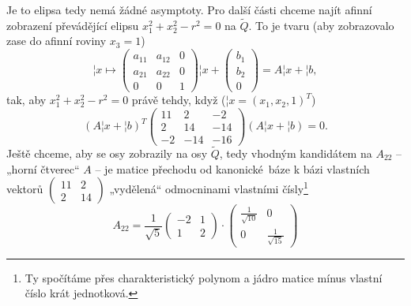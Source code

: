 \documentclass[12pt]{article}                   %
\begin{document}
\begin{priklad}[10.6]
	\begin{reseni}
		Je to elipsa tedy nemá žádné asymptoty. Pro další části chceme najít afinní zobrazení převádějící elipsu $x_1^2 + x_2^2 - r^2 = 0$ na $\tilde Q$. To je tvaru (aby zobrazovalo zase do afinní roviny $x_3 = 1$)
		$$ ¦x \mapsto \begin{pmatrix} a_{11} & a_{12} & 0 \\ a_{21} & a_{22} & 0 \\ 0 & 0 & 1 \end{pmatrix}¦x  + \begin{pmatrix} b_1 \\ b_2 \\ 0 \end{pmatrix} = A¦x + ¦b, $$
		tak, aby $x_1^2 + x_2^2 - r^2 = 0$ právě tehdy, když ($¦x = (x_1, x_2, 1)^T$)
		$$ (A¦x + ¦b)^T\begin{pmatrix} 11 & 2 & -2 \\ 2 & 14 & -14 \\ -2 & -14 & -16 \end{pmatrix} (A¦x + ¦b) = 0. $$
		Ještě chceme, aby se osy zobrazily na osy $\tilde Q$, tedy vhodným kandidátem na $A_{22}$ –„horní čtverec“ $A$ – je matice přechodu od kanonické báze k bázi vlastních vektorů $\begin{pmatrix} 11 & 2 \\ 2 & 14 \end{pmatrix}$ „vydělená“ odmocninami vlastními čísly\footnote{Ty spočítáme přes charakteristický polynom a jádro matice mínus vlastní číslo krát jednotková.}
		$$ A_{22} = \frac{1}{\sqrt{5}}\begin{pmatrix} -2 & 1 \\ 1 & 2 \end{pmatrix} · \begin{pmatrix} \frac{1}{\sqrt{10}} & 0 \\ 0 & \frac{1}{\sqrt{15}} \end{pmatrix} $$


\end{reseni}
\end{priklad}
\end{document}
